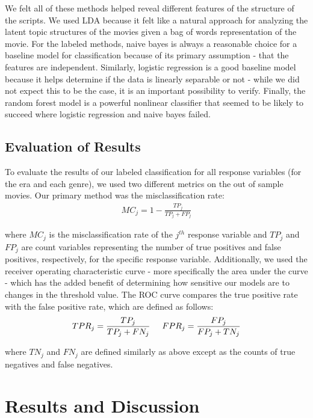 \documentclass{article} %
\begin{document}
We felt all of these methods helped reveal different features of the structure of the scripts. We used LDA because it felt like a natural approach for analyzing the latent topic structures of the movies given a bag of words representation of the movie. For the labeled methods, naive bayes is always a reasonable choice for a baseline model for classification because of its primary assumption - that the features are independent. Similarly, logistic regression is a good baseline model because it helps determine if the data is linearly separable or not - while we did not expect this to be the case, it is an important possibility to verify. Finally, the random forest model is a powerful nonlinear classifier that seemed to be likely to succeed where logistic regression and naive bayes failed.

\subsection{Evaluation of Results}

To evaluate the results of our labeled classification for all response variables (for the era and each genre), we used two different metrics on the out of sample movies. Our primary method was the misclassification rate:
\begin{align*}
MC_j = 1 - \frac{TP_j}{TP_j + FP_j}
\end{align*}

where $MC_j$ is the misclassification rate of the $j^{th}$ response variable and $TP_j$ and $FP_j$ are count variables representing the number of true positives and false positives, respectively, for the specific response variable. Additionally, we used the receiver operating characteristic curve - more specifically the area under the curve - which has the added benefit of determining how sensitive our models are to changes in the threshold value. The ROC curve compares the true positive rate with the false positive rate, which are defined as follows:
\begin{align*}
TPR_j = \frac{TP_j}{TP_j + FN_j} \hspace{5mm} FPR_j = \frac{FP_j}{FP_j + TN_j}
\end{align*}

where $TN_j$ and $FN_j$ are defined similarly as above except as the counts of true negatives and false negatives.

\section{Results and Discussion}
\end{document}
